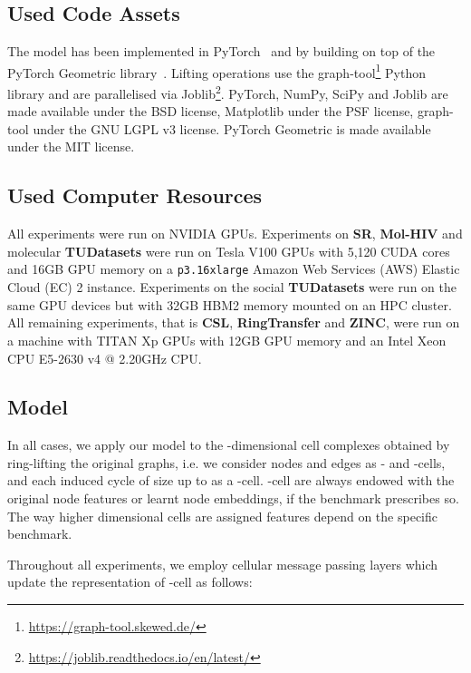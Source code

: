 \documentclass{article}
\begin{document}
\subsection{Used Code Assets} 

The model has been implemented in PyTorch~\citep{NEURIPS2019_9015} and by building on top of the PyTorch Geometric library~\citep{fey2019fast}. Lifting operations use the graph-tool\footnote{\url{https://graph-tool.skewed.de/}} Python library and are parallelised via Joblib\footnote{\url{https://joblib.readthedocs.io/en/latest/}}.
PyTorch, NumPy, SciPy and Joblib are made available under the BSD license, Matplotlib under the PSF license, graph-tool under the GNU LGPL v3 license. PyTorch Geometric is made available under the MIT license.

\subsection{Used Computer Resources}
All experiments were run on NVIDIA\textsuperscript{\textregistered} GPUs. Experiments on \textbf{SR}, \textbf{Mol-HIV} and molecular \textbf{TUDatasets} were run on Tesla V100 GPUs with 5,120 CUDA cores and 16GB GPU memory on a \texttt{p3.16xlarge} Amazon Web Services (AWS) Elastic Cloud (EC) 2 instance. Experiments on the social \textbf{TUDatasets} were run on the same GPU devices but with 32GB HBM2 memory mounted on an HPC cluster. All remaining experiments, that is \textbf{CSL}, \textbf{RingTransfer} and \textbf{ZINC}, were run on a machine with TITAN Xp GPUs with 12GB GPU memory and an Intel\textsuperscript{\textregistered} Xeon\textsuperscript{\textregistered} CPU E5-2630 v4 @ 2.20GHz CPU.

\subsection{Model}

In all cases, we apply our model to the -dimensional cell complexes obtained by ring-lifting the original graphs, i.e. we consider nodes and edges as - and -cells, and each induced cycle of size up to  as a -cell. -cell are always endowed with the original node features or learnt node embeddings, if the benchmark prescribes so. The way higher dimensional cells are assigned features depend on the specific benchmark.

Throughout all experiments, we employ cellular message passing layers which update the representation of -cell  as follows:
\end{document}

